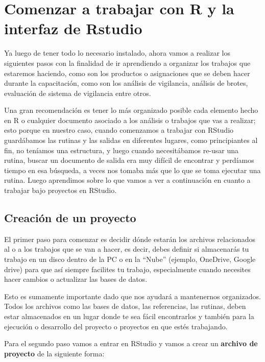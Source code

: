 \documentclass[
  letterpaper,
  DIV=11,
  numbers=noendperiod]{scrreprt}
\begin{document}

\chapter{Comenzar a trabajar con R y la interfaz de
Rstudio}\label{comenzar-a-trabajar-con-r-y-la-interfaz-de-rstudio}

Ya luego de tener todo lo necesario instalado, ahora vamos a realizar
los siguientes pasos con la finalidad de ir aprendiendo a organizar los
trabajos que estaremos haciendo, como son los productos o asignaciones
que se deben hacer durante la capacitación, como son los análisis de
vigilancia, análisis de brotes, evaluación de sistema de vigilancia
entre otros.

Una gran recomendación es tener lo más organizado posible cada elemento
hecho en R o cualquier documento asociado a los análisis o trabajos que
vas a realizar; esto porque en nuestro caso, cuando comenzamos a
trabajar con RStudio guardábamos las rutinas y las salidas en diferentes
lugares, como principiantes al fin, no teníamos una estructura, y luego
cuando necesitábamos re-usar una rutina, buscar un documento de salida
era muy difícil de encontrar y perdíamos tiempo en esa búsqueda, a veces
nos tomaba más que lo que se toma ejecutar una rutina. Luego aprendimos
sobre lo que vamos a ver a continuación en cuanto a trabajar bajo
proyectos en RStudio.

\section{Creación de un proyecto}\label{creaciuxf3n-de-un-proyecto}

El primer paso para comenzar es decidir dónde estarán los archivos
relacionados al o a los trabajos que se van a hacer, es decir, debes
definir si almacenarás tu trabajo en un disco dentro de la PC o en la
``Nube'' (ejemplo, OneDrive, Google drive) para que así siempre
facilites tu trabajo, especialmente cuando necesites hacer cambios o
actualizar las bases de datos.

Esto es sumamente importante dado que nos ayudará a mantenernos
organizados. Todos los archivos como las bases de datos, las
referencias, las rutinas, deben estar almacenados en un lugar donde te
sea fácil encontrarlos y también para la ejecución o desarrollo del
proyecto o proyectos en que estés trabajando.

Para el segundo paso vamos a entrar en RStudio y vamos a crear un
\textbf{archivo de proyecto} de la siguiente forma:
\end{document}
